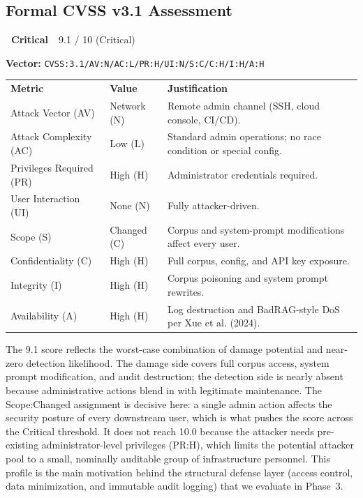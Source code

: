 \documentclass[a4paper,12pt]{report}
\newcommand{\badgecritical}{%
  \colorbox{danger}{\color{white}\small\textbf{~Critical~}}}
\newcommand{\cvssvec}[1]{\texttt{\small #1}}
\begin{document}
\subsection{Formal CVSS v3.1 Assessment}

\begin{cvssbox}{\badgecritical\ 9.1 / 10 (Critical)}
\vspace{2pt}
\begin{center}
\textbf{Vector:}\enspace
\cvssvec{CVSS:3.1/AV:N/AC:L/PR:H/UI:N/S:C/C:H/I:H/A:H}
\end{center}
\vspace{8pt}
\begin{tabular}{L{3.4cm} L{2.2cm} L{7.8cm}}
  \color{white}\small\textbf{Metric} &
  \color{white}\small\textbf{Value} &
  \color{white}\small\textbf{Justification} \\
  \small Attack Vector (AV)     & \small Network (N) & \small Remote admin channel (SSH, cloud console, CI/CD). \\
  \small Attack Complexity (AC) & \small Low (L)     & \small Standard admin operations; no race condition or special config. \\
  \small Privileges Required (PR)  & \small High (H) & \small Administrator credentials required. \\
  \small User Interaction (UI)  & \small None (N)    & \small Fully attacker-driven. \\
  \small Scope (S)              & \small Changed (C) & \small Corpus and system-prompt modifications affect every user. \\
  \small Confidentiality (C)    & \small High (H)    & \small Full corpus, config, and API key exposure. \\
  \small Integrity (I)          & \small High (H)    & \small Corpus poisoning and system prompt rewrites. \\
  \small Availability (A)       & \small High (H)    & \small Log destruction and BadRAG-style DoS per Xue et al. (2024). \\
\end{tabular}
\vspace{6pt}

\small The 9.1 score reflects the worst-case combination of damage
potential and near-zero detection likelihood. The damage side covers
full corpus access, system prompt modification, and audit destruction;
the detection side is nearly absent because administrative actions
blend in with legitimate maintenance. The Scope:Changed assignment is
decisive here: a single admin action affects the security posture of
every downstream user, which is what pushes the score across the
Critical threshold. It does not reach 10.0 because the attacker needs
pre-existing administrator-level privileges (PR:H), which limits the
potential attacker pool to a small, nominally auditable group of
infrastructure personnel. This profile is the main motivation behind
the structural defense layer (access control, data minimization, and
immutable audit logging) that we evaluate in Phase~3.
\end{cvssbox}
\end{document}
